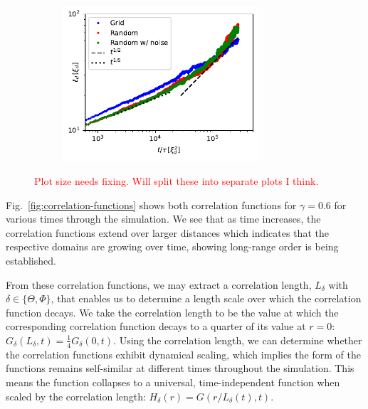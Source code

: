 \begin{figure}
\begin{subfigure}{0.5\textwidth}
        \centering
        \includegraphics[height=0.8\textwidth,width=0.8\textwidth]{
            gfx/ch-twoCompDynamics/scalar_vortex.pdf}
        \caption{\label{fig:scalar-vortex-lengths}}
    \end{subfigure}
    \caption{\textcolor{red}{Plot size needs fixing. Will split these into
    separate plots I think.}}
\end{figure}
Fig.~\ref{fig:correlation-functions} shows both correlation functions for
\(\gamma=0.6\) for various times through the simulation.
We see that as time increases, the correlation functions extend over larger
distances which indicates that the respective domains are growing over time,
showing long-range order is being established.

From these correlation functions, we may extract a correlation length,
\(L_\delta \) with \(\delta \in \{\Theta, \Phi \} \), that enables us to
determine a length scale over which the correlation function decays.
We take the correlation length to be the value at which the corresponding
correlation function decays to a quarter of its value at
\(r=0\): \(G_\delta(L_\delta, t) = \frac{1}{4}G_\delta(0, t)\).
Using the correlation length, we can determine whether the correlation functions
exhibit dynamical scaling, which implies the form of the functions remains
self-similar at different times throughout the simulation.
This means the function collapses to a universal, time-independent function
when scaled by the correlation length: \(H_\delta(r) = G(r/L_\delta(t), t)\).

